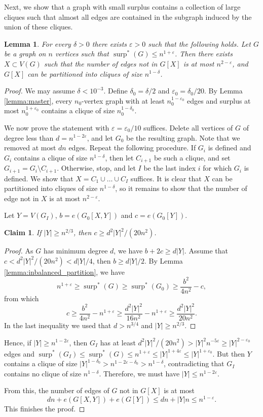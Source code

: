 \documentclass[11pt]{article}
\theoremstyle{plain}
\newtheorem{claim}[theorem]{Claim}
\newtheorem{lemma}[theorem]{Lemma}
\theoremstyle{definition}
\DeclareMathOperator{\surp}{surp}
\newcommand{\eps}{\varepsilon}
\begin{document}
Next, we show that a graph with small surplus contains a collection of large cliques such that almost all edges are contained in the subgraph induced by the union of these cliques.

\begin{lemma}\label{lemma:many_cliques}
For every $\delta>0$ there exists $\eps>0$ such that the following holds. Let $G$ be a graph on $n$ vertices such that $\surp^*(G)\leq n^{1+\eps}$. Then there exists $X\subset V(G)$ such that the number of edges not in $G[X]$ is at most $n^{2-\eps}$, and $G[X]$ can be partitioned into cliques of size $n^{1-\delta}$. 
\end{lemma}

\begin{proof}
We may assume $\delta<10^{-3}$. Define $\delta_0=\delta/2$ and $\eps_0=\delta_0/20$. By Lemma \ref{lemma:master}, every $n_0$-vertex graph with at least $n_0^{1-\eps_0}$ edges and surplus at most $n_0^{1+\eps_0}$ contains a clique of size $n_0^{1-\delta_0}$. 

We now prove the statement with $\eps=\eps_0/10$ suffices. Delete all vertices of $G$ of degree less than $d=n^{1-2\eps}$, and let $G_0$ be the resulting graph. Note that we removed at most $dn$ edges. Repeat the following procedure. If $G_i$ is defined and $G_i$ contains a clique of size $n^{1-\delta}$, then let $C_{i+1}$ be such a clique, and set $G_{i+1}=G_i\setminus C_{i+1}$. Otherwise, stop, and let $I$ be the last index $i$ for which $G_i$ is defined. We show that $X=C_1\cup\dots\cup C_I$ suffices. It is clear that $X$ can be partitioned into cliques of size $n^{1-\delta}$, so it remains to show that the number of edge not in $X$ is at most $n^{2-\eps}$. 

Let $Y=V(G_I)$, $b=e(G_0[X,Y])$ and $c=e(G_0[Y])$.
\begin{claim}
    If $|Y|\geq n^{2/3}$, then $c\geq d^2|Y|^2/(20n^2)$.
\end{claim}
\begin{proof}
    As $G$ has minimum degree $d$, we have $b+2c\geq d|Y|$. 
    Assume that $c<d^2|Y|^2/(20n^2)<d|Y|/4$, then $b\geq d|Y|/2$. 
    By Lemma \ref{lemma:inbalanced_partition}, we have
    $$
        n^{1+\eps}\geq \surp^*(G)\geq \surp^*(G_0)\geq \frac{b^2}{4n^2}-c,
    $$
    from which 
    $$c\geq \frac{b^2}{4n^2}-n^{1+\eps}\geq \frac{d^2|Y|^2}{16n^2}-n^{1+\eps}\geq \frac{d^2|Y|^2}{20n^2}.$$
    In the last inequality we used that $d>n^{3/4}$ and $|Y|\geq n^{2/3}$.
\end{proof}
Hence, if $|Y|\geq n^{1-2\eps}$, then $G_I$ has at least $d^2|Y|^2/(20n^2)>|Y|^2n^{-5\eps}\geq |Y|^{2-\eps_0}$ edges and $\surp^*(G_I)\leq \surp^*(G)\leq n^{1+\eps}\leq |Y|^{1+4\eps}\leq |Y|^{1+\eps_0}$. But then $Y$ contains a clique of size $|Y|^{1-\delta_0}>n^{1-2\eps-\delta_0}>n^{1-\delta}$, contradicting that $G_I$ contains no clique of size $n^{1-\delta}$. Therefore, we must have $|Y|\leq n^{1-2\eps}$.

From this, the number of edges of $G$ not in $G[X]$ is at most 
$$dn+e(G[X,Y])+e(G[Y])\leq dn+|Y|n\leq n^{1-\eps}.$$
This finishes the proof.
\end{proof}
\end{document}
